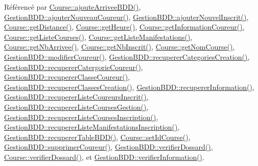 Référencé par \hyperlink{class_course_ac99042bf8b20e8d3a54e72c8a80f7ee7}{Course\+::ajoute\+Arrivee\+B\+D\+D()}, \hyperlink{class_gestion_b_d_d_ae71561eea6d1163ff067f079ccc6d169}{Gestion\+B\+D\+D\+::ajouter\+Nouveau\+Coureur()}, \hyperlink{class_gestion_b_d_d_a71391d5419969b52cd999463b5326599}{Gestion\+B\+D\+D\+::ajouter\+Nouvel\+Inscrit()}, \hyperlink{class_course_af20fcd6d6eb2dfbd3b0f12e273f12b27}{Course\+::get\+Distance()}, \hyperlink{class_course_afc21f8195edd50c9fd266cff0c401b7c}{Course\+::get\+Heure()}, \hyperlink{class_course_a7ba5d2c9865065e95f49a24fbeec7857}{Course\+::get\+Information\+Coureur()}, \hyperlink{class_course_ae5e74946d973166ad3000e38600acf20}{Course\+::get\+Liste\+Courses()}, \hyperlink{class_course_a0d995ef72152208e02eb3b10315dfabb}{Course\+::get\+Liste\+Manifestations()}, \hyperlink{class_course_ad8dd87e7f299bc938f40423f28c837e8}{Course\+::get\+Nb\+Arrivee()}, \hyperlink{class_course_ad0ff4153f1e02826d551f478f95ad260}{Course\+::get\+Nb\+Inscrit()}, \hyperlink{class_course_a7b4485a0b38bc3b908131962b705d880}{Course\+::get\+Nom\+Course()}, \hyperlink{class_gestion_b_d_d_afad096d7e405d35a818d4858ee34df61}{Gestion\+B\+D\+D\+::modifier\+Coureur()}, \hyperlink{class_gestion_b_d_d_a76ab3e307ad9005dcdb2781fc77fc5c8}{Gestion\+B\+D\+D\+::recuperer\+Categories\+Creation()}, \hyperlink{class_gestion_b_d_d_ad7b0117ad5d55f21e6f00858038f4a85}{Gestion\+B\+D\+D\+::recuperer\+Catergorie\+Coureur()}, \hyperlink{class_gestion_b_d_d_a0e90b16b2e330de9cc80f72f0d648e5d}{Gestion\+B\+D\+D\+::recuperer\+Classe\+Coureur()}, \hyperlink{class_gestion_b_d_d_a38d728d644f23048f1a6d3e6d4656764}{Gestion\+B\+D\+D\+::recuperer\+Classes\+Creation()}, \hyperlink{class_gestion_b_d_d_a0a2fa02b90974684658937fbfb55bf0a}{Gestion\+B\+D\+D\+::recuperer\+Information()}, \hyperlink{class_gestion_b_d_d_a09b547cb065256acd269c64e273c93fd}{Gestion\+B\+D\+D\+::recuperer\+Liste\+Coureurs\+Inscrit()}, \hyperlink{class_gestion_b_d_d_ac35de40fd5860b3130f71788ecaa5ef3}{Gestion\+B\+D\+D\+::recuperer\+Liste\+Courses\+Gestion()}, \hyperlink{class_gestion_b_d_d_a59ef29e28993c64aa4d5a8c42a8fb08d}{Gestion\+B\+D\+D\+::recuperer\+Liste\+Courses\+Inscription()}, \hyperlink{class_gestion_b_d_d_a6c1ab5e51fbd6c92bb096badbeac0df5}{Gestion\+B\+D\+D\+::recuperer\+Liste\+Manifestations\+Inscription()}, \hyperlink{class_gestion_b_d_d_a2b44ebc5bf5b1a7babde6512817a85b4}{Gestion\+B\+D\+D\+::recuperer\+Table\+B\+D\+D()}, \hyperlink{class_course_a36cf16c971841431947b6fbe2b3f3d27}{Course\+::set\+Id\+Course()}, \hyperlink{class_gestion_b_d_d_afe47ec92274b7998131c5d4e6551d177}{Gestion\+B\+D\+D\+::supprimer\+Coureur()}, \hyperlink{class_gestion_b_d_d_a1a39bbc7bfcb60d286363b9d2dd7f88b}{Gestion\+B\+D\+D\+::verifier\+Dossard()}, \hyperlink{class_course_a6cb3ede6a11e4813f95be92f4459a3c2}{Course\+::verifier\+Dossard()}, et \hyperlink{class_gestion_b_d_d_abfd3cfb9553a83aafd86c3149869d6c0}{Gestion\+B\+D\+D\+::verifier\+Information()}.


